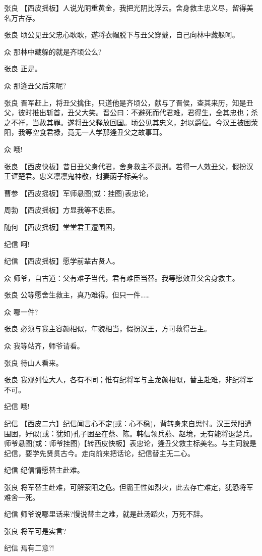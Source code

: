 张良
【西皮摇板】人说光阴重黄金，我把光阴比浮云。舍身救主忠义尽，留得美名万古存。

张良 顷公见丑父忠心耿耿，遂将衣帽脱下与丑父穿戴，自己向林中藏躲呵。

众 那林中藏躲的就是齐顷公么?

张良 正是。

众 那逄丑父后来呢?

张良
晋军赶上，将丑父擒住，只道他是齐顷公，献与了晋侯，查其来历，知是丑父，彼时推出斩首，丑父大笑。晋公曰：不避死而代君难，君得生，全其忠也；杀之不祥，当赦其罪。遂将丑父释放回国。顷公见其忠义，封以爵位。今汉王被困荥阳，我等空食君禄，竟无一人学那逄丑父之故事耳。

众 哦!

张良
【西皮快板】昔日丑父身代君，舍身救主不畏刑。若得一人效丑父，假扮汉王诓楚君。忠义凛凛鬼神敬，封妻荫子标美名。

曹参 【西皮摇板】军师悬图(或：挂图)表忠论，

周勃 【西皮摇板】方显我等不忠臣。

随何 【西皮摇板】堂堂君王遭围困，

纪信 呵!

纪信 【西皮摇板】愿学前辈古贤人。

众 师爷，自古道：父有难子当代，君有难臣当替。我等愿效丑父舍身救主。

张良 公等愿舍生救主，真乃难得。但只一件\ldots{}\ldots{}

众 哪一件?

张良 必须与我主容颜相似，年貌相当，假扮汉王，方可救得吾主。

众 我等站齐，师爷请看。

张良 待山人看来。

张良
我观列位大人，各有不同；惟有纪将军与主龙颜相似，替主赴难，非纪将军不可。

纪信 哦!

纪信
【西皮二六】纪信闻言心不定(或：心不稳)，背转身来自思忖。汉王荥阳遭围困，好似(或：犹如)孔子困至在蔡、陈。韩信领兵燕、赵境，无有能将退楚兵。师爷悬图(或：师爷挂图)【转西皮快板】表忠论，逄丑父救主标美名。与主同貌是纪信，要学先贤贯古今。走向前来把话论，纪信替主无二心。

纪信 纪信情愿替主赴难。

张良
将军替主赴难，可解荥阳之危。但霸王性如烈火，此去存亡难定，犹恐将军难舍一死。

纪信 师爷说哪里话来?慢说替主之难，就是赴汤蹈火，万死不辞。

张良 将军可是实言?

纪信 焉有二意?!

